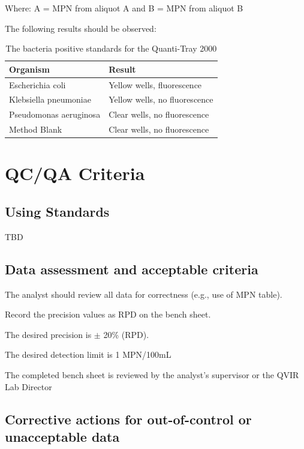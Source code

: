 \documentclass[12pt]{../SOP4_alpha}\usepackage[]{graphicx}\usepackage[]{xcolor}
\begin{document}
Where: A = MPN from aliquot A and
 B = MPN from aliquot B 

\NP The following results should be observed:


\begin{table}
\caption{The bacteria positive standards for the Quanti-Tray 2000}
		\begin{tabular}{ll}\hline

Organism                &  Result \\ \hline \hline
Escherichia coli        & Yellow wells, fluorescence \\
Klebsiella pneumoniae   & Yellow wells, no fluorescence \\
Pseudomonas aeruginosa  & Clear wells, no fluorescence \\
Method Blank            & Clear wells, no fluorescence \\ \hline
  \end{tabular}
\end{table}


\section{QC/QA Criteria}

\subsection{Using Standards}

\NP TBD

\subsection{Data assessment and acceptable criteria}

\NP The analyst should review all data for correctness (e.g., use of MPN table).


\NP Record the precision values as RPD on the bench sheet.

\NP The desired precision is $\pm$ 20\% (RPD).

\NP The desired detection limit is 1 MPN/100mL

\NP The completed bench sheet is reviewed by the analyst's supervisor or the
QVIR Lab Director 


\subsection{Corrective actions for out-of-control or unacceptable data}
\end{document}
